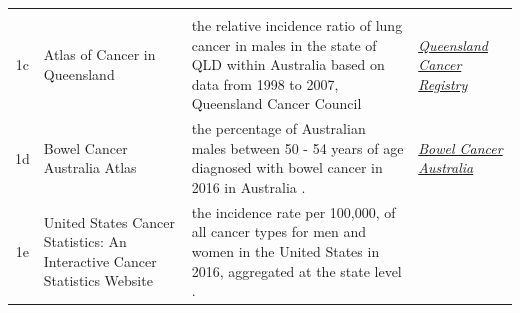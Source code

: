 \documentclass{monashthesis}
\begin{document}
\begin{longtable}[]{@{}clll@{}}
\begin{minipage}[t]{0.26\columnwidth}
\end{minipage}\tabularnewline
\begin{minipage}[t]{0.08\columnwidth}\centering
1c\strut
\end{minipage} & \begin{minipage}[t]{0.20\columnwidth}\raggedright
Atlas of Cancer in Queensland\strut
\end{minipage} & \begin{minipage}[t]{0.35\columnwidth}\raggedright
the relative incidence ratio of lung cancer in males in the state of QLD within Australia based on data from 1998 to 2007, Queensland Cancer Council\autocite{QLDcancerAtlas}\strut
\end{minipage} & \begin{minipage}[t]{0.26\columnwidth}\raggedright
\emph{\href{https://cancerqld.org.au/research/cancer-registries/queensland-cancer-registry/}{Queensland Cancer Registry}}\strut
\end{minipage}\tabularnewline
\begin{minipage}[t]{0.08\columnwidth}\centering
1d\strut
\end{minipage} & \begin{minipage}[t]{0.20\columnwidth}\raggedright
Bowel Cancer Australia Atlas\strut
\end{minipage} & \begin{minipage}[t]{0.35\columnwidth}\raggedright
the percentage of Australian males between 50 - 54 years of age diagnosed with bowel cancer in 2016 in Australia \autocite{Bowel}.\strut
\end{minipage} & \begin{minipage}[t]{0.26\columnwidth}\raggedright
\emph{\href{https://www.bowelcanceraustralia.org/}{Bowel Cancer Australia}}\strut
\end{minipage}\tabularnewline
\begin{minipage}[t]{0.08\columnwidth}\centering
1e\strut
\end{minipage} & \begin{minipage}[t]{0.20\columnwidth}\raggedright
United States Cancer Statistics: An Interactive Cancer Statistics Website\strut
\end{minipage} & \begin{minipage}[t]{0.35\columnwidth}\raggedright
the incidence rate per 100,000, of all cancer types for men and women in the United States in 2016, aggregated at the state level \autocite{USInteractive}.\strut
\end{minipage} & \begin{minipage}[t]{0.26\columnwidth}\raggedright

\end{minipage}
\end{longtable}
\end{document}
